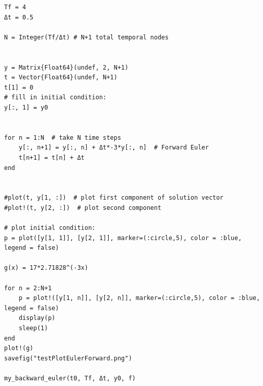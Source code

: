 \documentclass[a4paper,10pt,BCOR10mm,oneside,headsepline]{scrartcl}
\begin{document}
\begin{lstlisting}
Tf = 4
Δt = 0.5

N = Integer(Tf/Δt) # N+1 total temporal nodes


y = Matrix{Float64}(undef, 2, N+1)
t = Vector{Float64}(undef, N+1)
t[1] = 0
# fill in initial condition:
y[:, 1] = y0


for n = 1:N  # take N time steps
    y[:, n+1] = y[:, n] + Δt*-3*y[:, n]  # Forward Euler
    t[n+1] = t[n] + Δt
end


#plot(t, y[1, :])  # plot first component of solution vector
#plot!(t, y[2, :])  # plot second component

# plot initial condition:
p = plot([y[1, 1]], [y[2, 1]], marker=(:circle,5), color = :blue, legend = false)

g(x) = 17*2.71828^(-3x)

for n = 2:N+1
    p = plot!([y[1, n]], [y[2, n]], marker=(:circle,5), color = :blue, legend = false)
    display(p)
    sleep(1)
end
plot!(g)
savefig("testPlotEulerForward.png")

my_backward_euler(t0, Tf, Δt, y0, f)

\end{lstlisting}
\end{document}
